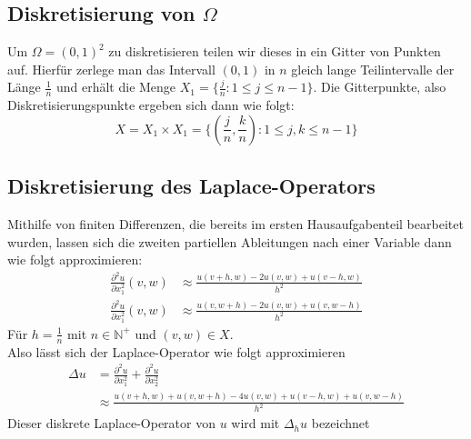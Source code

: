\documentclass{scrartcl}
\theoremstyle{remark}
\begin{document}
\subsection{Diskretisierung von \(\Omega\)}
Um \(\Omega = (0,1)^{2}\) zu diskretisieren teilen wir dieses in ein Gitter von Punkten auf.
Hierfür zerlege man das Intervall \((0,1)\) in \(n\) gleich lange Teilintervalle der Länge \(\frac{1}{n}\)
und erhält die Menge \(X_{1} = \{\frac{j}{n}: 1 \leqslant j \leqslant n - 1\} \).
Die Gitterpunkte, also Diskretisierungspunkte ergeben sich dann wie folgt:
\[X = X_{1} \times X_{1} = \{(\frac{j}{n}, \frac{k}{n}): 1 \leqslant j,k \leqslant n - 1\} \] \cite{PPI_Poisson}


\subsection{Diskretisierung des Laplace-Operators}
Mithilfe von finiten Differenzen, die bereits im ersten Hausaufgabenteil bearbeitet wurden, lassen sich die zweiten partiellen Ableitungen 
nach einer Variable dann wie folgt approximieren:
\begin{align*}
  \frac{\partial^{2}u}{\partial x_{1}^{2}}(v, w) &\approx \frac{u(v + h, w) - 2u(v, w) + u(v - h, w)}{h^{2}} \\
  \frac{\partial^{2}u}{\partial x_{1}^{2}}(v, w) &\approx \frac{u(v, w + h) - 2u(v, w) + u(v, w - h)}{h^{2}}
\end{align*}
Für \(h = \frac{1}{n}\) mit \(n \in \mathbb{N}^{+}\) und \((v, w) \in X\). \\
Also lässt sich der Laplace-Operator wie folgt approximieren
\begin{align*}
  \Delta u &= \frac{\partial^{2}u}{\partial x_{1}^{2}} + \frac{\partial^{2}u}{\partial x_{2}^{2}} \\
           &\approx \frac{u(v + h, w) + u(v, w + h) - 4u(v, w) + u(v - h, w) + u(v, w - h)}{h^2}
\end{align*}
Dieser diskrete Laplace-Operator von \(u\) wird mit \(\Delta_{h}u\) bezeichnet
\end{document}
